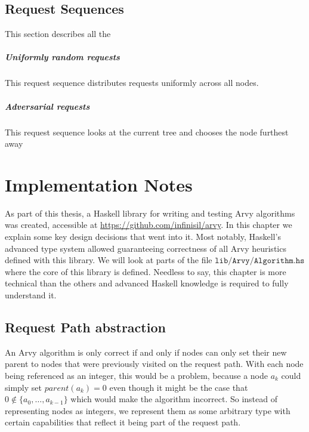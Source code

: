 \documentclass[a4paper, oneside]{discothesis}
\begin{document}
\section{Request Sequences}

This section describes all the 

\paragraph{Uniformly random requests} This request sequence distributes requests uniformly across all nodes.

\paragraph{Adversarial requests} This request sequence looks at the current tree and chooses the node furthest away

\chapter{Implementation Notes}

As part of this thesis, a Haskell library for writing and testing Arvy algorithms was created, accessible at \url{https://github.com/infinisil/arvy}. In this chapter we explain some key design decisions that went into it. Most notably, Haskell's advanced type system allowed guaranteeing correctness of all Arvy heuristics defined with this library. We will look at parts of the file \href{https://github.com/Infinisil/arvy/blob/1bdac2aa8e599372f2b058d26ec9c33fd53d7a72/lib/Arvy/Algorithm.hs}{$\texttt{lib/Arvy/Algorithm.hs}$} where the core of this library is defined. Needless to say, this chapter is more technical than the others and advanced Haskell knowledge is required to fully understand it.

\section{Request Path abstraction}

An Arvy algorithm is only correct if and only if nodes can only set their new parent to nodes that were previously visited on the request path. With each node being referenced as an integer, this would be a problem, because a node $a_{k}$ could simply set $parent(a_{k})=0$ even though it might be the case that $0\notin\{a_{0},\dots,a_{k-1}\}$ which would make the algorithm incorrect. So instead of representing nodes as integers, we represent them as some arbitrary type with certain capabilities that reflect it being part of the request path.
\end{document}
